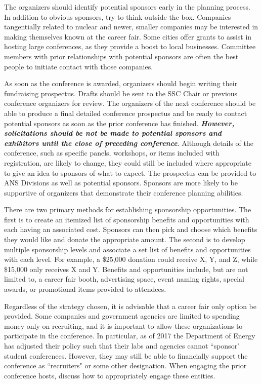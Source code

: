 \documentclass[12pt]{article}
\begin{document}
The organizers should identify potential sponsors early in the planning process.
In addition to obvious sponsors, try to think outside the box.
Companies tangentially related to nuclear and newer, smaller companies may be interested in making themselves known at the career fair.
Some cities offer grants to assist in hosting large conferences, as they provide a boost to local businesses.
Committee members with prior relationships with potential sponsors are often the best people to initiate contact with those companies.

As soon as the conference is awarded, organizers should begin writing their fundraising prospectus.
Drafts should be sent to the SSC Chair or previous conference organizers for review.
The organizers of the next conference should be able to produce a final detailed conference prospectus and be ready to contact potential sponsors as soon as the prior conference has finished.
\emph{\textbf{However, solicitations should be not be made to potential sponsors and exhibitors until the close of preceding conference}}.
Although details of the conference, such as specific panels, workshops, or items included with registration, are likely to change, they could still be included where appropriate to give an idea to sponsors of what to expect.
The prospectus can be provided to ANS Divisions as well as potential sponsors.
Sponsors are more likely to be supportive of organizers that demonstrate their conference planning abilities.

There are two primary methods for establishing sponsorship opportunities.
The first is to create an itemized list of sponsorship benefits and opportunities with each having an associated cost.
Sponsors can then pick and choose which benefits they would like and donate the appropriate amount.
The second is to develop multiple sponsorship levels and associate a set list of benefits and opportunities with each level.
For example, a \$25,000 donation could receive X, Y, and Z, while \$15,000 only receives X and Y.
Benefits and opportunities include, but are not limited to, a career fair booth, advertising space, event naming rights, special awards, or promotional items provided to attendees.

Regardless of the strategy chosen, it is advisable that a career fair only option be provided.
Some companies and government agencies are limited to spending money only on recruiting, and it is important to allow these organizations to participate in the conference.
In particular, as of 2017 the Department of Energy has adjusted their policy such that their labs and agencies cannot ``sponsor" student conferences.
However, they may still be able to financially support the conference as ``recruiters" or some other designation.
When engaging the prior conference hosts, discuss how to appropriately engage these entities.
\end{document}
